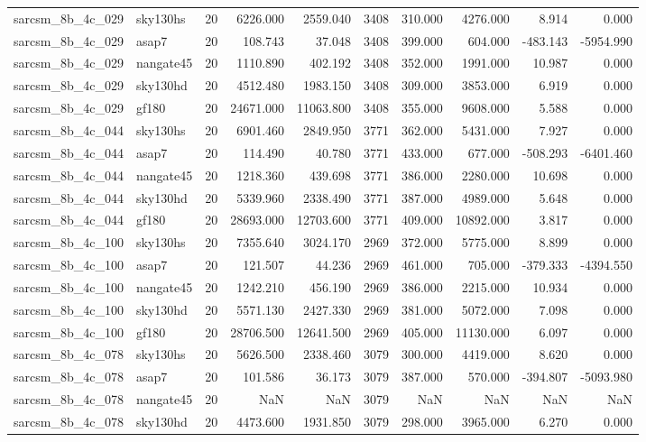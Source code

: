 \documentclass{article}
\begin{document}
\begin{longtable}{llrrrrrrrr}
sarcsm\_8b\_4c\_029 & sky130hs & 20 & 6226.000 & 2559.040 & 3408 & 310.000 & 4276.000 & 8.914 & 0.000 \\
sarcsm\_8b\_4c\_029 & asap7 & 20 & 108.743 & 37.048 & 3408 & 399.000 & 604.000 & -483.143 & -5954.990 \\
sarcsm\_8b\_4c\_029 & nangate45 & 20 & 1110.890 & 402.192 & 3408 & 352.000 & 1991.000 & 10.987 & 0.000 \\
sarcsm\_8b\_4c\_029 & sky130hd & 20 & 4512.480 & 1983.150 & 3408 & 309.000 & 3853.000 & 6.919 & 0.000 \\
sarcsm\_8b\_4c\_029 & gf180 & 20 & 24671.000 & 11063.800 & 3408 & 355.000 & 9608.000 & 5.588 & 0.000 \\
sarcsm\_8b\_4c\_044 & sky130hs & 20 & 6901.460 & 2849.950 & 3771 & 362.000 & 5431.000 & 7.927 & 0.000 \\
sarcsm\_8b\_4c\_044 & asap7 & 20 & 114.490 & 40.780 & 3771 & 433.000 & 677.000 & -508.293 & -6401.460 \\
sarcsm\_8b\_4c\_044 & nangate45 & 20 & 1218.360 & 439.698 & 3771 & 386.000 & 2280.000 & 10.698 & 0.000 \\
sarcsm\_8b\_4c\_044 & sky130hd & 20 & 5339.960 & 2338.490 & 3771 & 387.000 & 4989.000 & 5.648 & 0.000 \\
sarcsm\_8b\_4c\_044 & gf180 & 20 & 28693.000 & 12703.600 & 3771 & 409.000 & 10892.000 & 3.817 & 0.000 \\
sarcsm\_8b\_4c\_100 & sky130hs & 20 & 7355.640 & 3024.170 & 2969 & 372.000 & 5775.000 & 8.899 & 0.000 \\
sarcsm\_8b\_4c\_100 & asap7 & 20 & 121.507 & 44.236 & 2969 & 461.000 & 705.000 & -379.333 & -4394.550 \\
sarcsm\_8b\_4c\_100 & nangate45 & 20 & 1242.210 & 456.190 & 2969 & 386.000 & 2215.000 & 10.934 & 0.000 \\
sarcsm\_8b\_4c\_100 & sky130hd & 20 & 5571.130 & 2427.330 & 2969 & 381.000 & 5072.000 & 7.098 & 0.000 \\
sarcsm\_8b\_4c\_100 & gf180 & 20 & 28706.500 & 12641.500 & 2969 & 405.000 & 11130.000 & 6.097 & 0.000 \\
sarcsm\_8b\_4c\_078 & sky130hs & 20 & 5626.500 & 2338.460 & 3079 & 300.000 & 4419.000 & 8.620 & 0.000 \\
sarcsm\_8b\_4c\_078 & asap7 & 20 & 101.586 & 36.173 & 3079 & 387.000 & 570.000 & -394.807 & -5093.980 \\
sarcsm\_8b\_4c\_078 & nangate45 & 20 & NaN & NaN & 3079 & NaN & NaN & NaN & NaN \\
sarcsm\_8b\_4c\_078 & sky130hd & 20 & 4473.600 & 1931.850 & 3079 & 298.000 & 3965.000 & 6.270 & 0.000 \\

\end{longtable}
\end{document}
